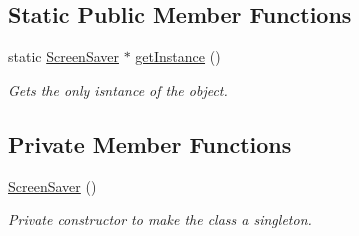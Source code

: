 \subsection*{Static Public Member Functions}
\begin{DoxyCompactItemize}
\item 
static \hyperlink{class_screen_saver}{Screen\-Saver} $\ast$ \hyperlink{class_screen_saver_a01fcce88efebbd86ce9cd0f88b33c706}{get\-Instance} ()
\begin{DoxyCompactList}\small\item\em Gets the only isntance of the object. \end{DoxyCompactList}\end{DoxyCompactItemize}
\subsection*{Private Member Functions}
\begin{DoxyCompactItemize}
\item 
\hyperlink{class_screen_saver_a57c7ffe3ed1e7bcc7768a50b012c7831}{Screen\-Saver} ()
\begin{DoxyCompactList}\small\item\em Private constructor to make the class a singleton. \end{DoxyCompactList}\end{DoxyCompactItemize}
